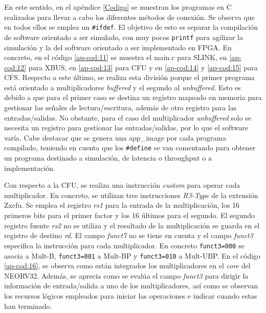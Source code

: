 En este sentido, en el apéndice \ref{Codigo} se muestran los programas en C realizados para llevar a cabo los diferentes métodos de conexión.
Se observa que en todos ellos se emplea un \texttt{#ifdef}.
El objetivo de esto es separar la compilación de software orientado a ser simulado, con muy pocos \texttt{printf} para agilizar la simulación y la del software orientado a ser implementado en FPGA.
En concreto, en el código \ref{ap-cod:11} se muestra el main.c para SLINK, en \ref{ap-cod:12} para XBUS, en \ref{ap-cod:13} para CFU y en \ref{ap-cod:14} y \ref{ap-cod:15} para CFS.
Respecto a este último, se realiza esta división porque el primer programa está orientado a multiplicadores \textit{buffered} y el segundo al \textit{unbuffered}.
Esto es debido a que para el primer caso se destina un registro mapeado en memoria para gestionar las señales de lectura/escritura, además de otro registro para las entradas/salidas. No obstante, para el caso del multiplicador \textit{unbuffered} solo se necesita un registro para gestionar las entradas/salidas, por lo que el software varía.
Cabe destacar que se genera una app\_image por cada programa compilado, teniendo en cuenta que los \texttt{#define} se van comentando para obtener un programa destinado a simulación, de latencia o throughput o a implementación.

Con respecto a la CFU, se realiza una instrucción \textit{custom} para operar cada multiplicador.
En concreto, se utilizan tres instrucciones \textit{R3-Type} de la extensión Zxcfu.
Se emplea el registro \textit{rs1} para la entrada de la multiplicación, los 16 primeros bits para el primer factor y los 16 últimos para el segundo.
El segundo registro fuente \textit{rs2} no se utiliza y el resultado de la multiplicación se guarda en el registro de destino \textit{rd}.
El campo \textit{funct7} no se tiene en cuenta y el campo \textit{funct3} especifica la instrucción para cada multiplicador. 
En concreto \texttt{funct3=000} se asocia a Mult-B, \texttt{funct3=001} a Mult-BP y \texttt{funct3=010} a Mult-UBP.
En el código \ref{ap-cod:16}, se observa como están integrados los multiplicadores en el \textit{core} del NEORV32.
Además, se aprecia como se evalúa el campo \textit{funct3} para dirigir la información de entrada/salida a uno de los multiplicadores, así como se observan los recursos lógicos empleados para iniciar las operaciones e indicar cuando estas han terminado.

